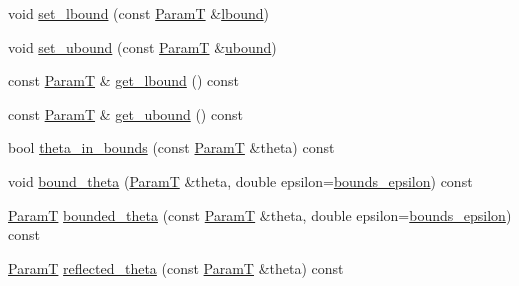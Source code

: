 \begin{DoxyCompactItemize}
\item 
void \hyperlink{classmappel_1_1PointEmitterModel_a737fa5857415b9830fa2e5ccdff48541}{set\+\_\+lbound} (const \hyperlink{classmappel_1_1PointEmitterModel_a665ec6aea3aac139bb69a23c06d4b9a1}{ParamT} \&\hyperlink{classmappel_1_1PointEmitterModel_a889bc82f74cfa654da121e5770296ab2}{lbound})
\item 
void \hyperlink{classmappel_1_1PointEmitterModel_a7363961cc405e585b39e81a7ad85c8d6}{set\+\_\+ubound} (const \hyperlink{classmappel_1_1PointEmitterModel_a665ec6aea3aac139bb69a23c06d4b9a1}{ParamT} \&\hyperlink{classmappel_1_1PointEmitterModel_a35b883e84b6a2e0093bdf482c623beef}{ubound})
\item 
const \hyperlink{classmappel_1_1PointEmitterModel_a665ec6aea3aac139bb69a23c06d4b9a1}{ParamT} \& \hyperlink{classmappel_1_1PointEmitterModel_aeb486e8f6f6fa694e3746e84eebcf848}{get\+\_\+lbound} () const 
\item 
const \hyperlink{classmappel_1_1PointEmitterModel_a665ec6aea3aac139bb69a23c06d4b9a1}{ParamT} \& \hyperlink{classmappel_1_1PointEmitterModel_a0dfb473c48d177a4540d328abb03cd55}{get\+\_\+ubound} () const 
\item 
bool \hyperlink{classmappel_1_1PointEmitterModel_ad50dfc29b6e7167fb4caf8683353079d}{theta\+\_\+in\+\_\+bounds} (const \hyperlink{classmappel_1_1PointEmitterModel_a665ec6aea3aac139bb69a23c06d4b9a1}{ParamT} \&theta) const 
\item 
void \hyperlink{classmappel_1_1PointEmitterModel_a789dfcc9ea1df17a0282fca5705ade85}{bound\+\_\+theta} (\hyperlink{classmappel_1_1PointEmitterModel_a665ec6aea3aac139bb69a23c06d4b9a1}{ParamT} \&theta, double epsilon=\hyperlink{classmappel_1_1PointEmitterModel_ac987a119137b85a27704b1c40e3fab8c}{bounds\+\_\+epsilon}) const 
\item 
\hyperlink{classmappel_1_1PointEmitterModel_a665ec6aea3aac139bb69a23c06d4b9a1}{ParamT} \hyperlink{classmappel_1_1PointEmitterModel_ac342b21db8970dfa0b2809ffe5e73d06}{bounded\+\_\+theta} (const \hyperlink{classmappel_1_1PointEmitterModel_a665ec6aea3aac139bb69a23c06d4b9a1}{ParamT} \&theta, double epsilon=\hyperlink{classmappel_1_1PointEmitterModel_ac987a119137b85a27704b1c40e3fab8c}{bounds\+\_\+epsilon}) const 
\item 
\hyperlink{classmappel_1_1PointEmitterModel_a665ec6aea3aac139bb69a23c06d4b9a1}{ParamT} \hyperlink{classmappel_1_1PointEmitterModel_a7dd386776870462e8f20c646b6fed1e3}{reflected\+\_\+theta} (const \hyperlink{classmappel_1_1PointEmitterModel_a665ec6aea3aac139bb69a23c06d4b9a1}{ParamT} \&theta) const 

\end{DoxyCompactItemize}
